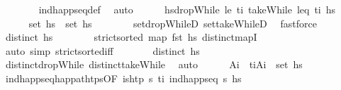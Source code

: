 \begin{isabellebody}
\ \ \ \ \ \ \isamarkupfalse%
\ ind{\isacharunderscore}{\kern0pt}happ{\isacharunderscore}{\kern0pt}seq{\isacharunderscore}{\kern0pt}def\ \isamarkupfalse%
\ auto\isanewline
\ \ \ \ \isamarkupfalse%
\ {\isacharquery}{\kern0pt}hs{\isacharprime}{\kern0pt}{\isacharequal}{\kern0pt}{\isachardoublequoteopen}dropWhile\ {\isacharparenleft}{\kern0pt}le\ t\isactrlsub i{\isacharparenright}{\kern0pt}\ {\isacharparenleft}{\kern0pt}takeWhile\ {\isacharparenleft}{\kern0pt}leq\ t\isactrlsub i{\isacharparenright}{\kern0pt}\ hs{\isacharparenright}{\kern0pt}{\isachardoublequoteclose}\isanewline
\ \ \ \ \isamarkupfalse%
\ {\isachardoublequoteopen}set\ {\isacharquery}{\kern0pt}hs{\isacharprime}{\kern0pt}\ {\isasymsubseteq}\ set\ hs{\isachardoublequoteclose}\isanewline
\ \ \ \ \ \ \isamarkupfalse%
\ set{\isacharunderscore}{\kern0pt}dropWhileD\ set{\isacharunderscore}{\kern0pt}takeWhileD\ \isamarkupfalse%
\ fastforce\isanewline
\ \ \ \ \isamarkupfalse%
\ {\isachardoublequoteopen}distinct\ hs{\isachardoublequoteclose}\isanewline
\ \ \ \ \ \ \isamarkupfalse%
\ {\isacartoucheopen}strict{\isacharunderscore}{\kern0pt}sorted\ {\isacharparenleft}{\kern0pt}map\ fst\ hs{\isacharparenright}{\kern0pt}{\isacartoucheclose}\ distinct{\isacharunderscore}{\kern0pt}mapI\ \isamarkupfalse%
\ {\isacharparenleft}{\kern0pt}auto\ simp{\isacharcolon}{\kern0pt}\ strict{\isacharunderscore}{\kern0pt}sorted{\isacharunderscore}{\kern0pt}iff{\isacharparenright}{\kern0pt}\isanewline
\ \ \ \ \isamarkupfalse%
\ \isamarkupfalse%
\ {\isachardoublequoteopen}distinct\ {\isacharquery}{\kern0pt}hs{\isacharprime}{\kern0pt}{\isachardoublequoteclose}\isanewline
\ \ \ \ \ \ \isamarkupfalse%
\ distinct{\isacharunderscore}{\kern0pt}dropWhile\ distinct{\isacharunderscore}{\kern0pt}takeWhile\ \isamarkupfalse%
\ auto\isanewline
\ \ \ \ \isamarkupfalse%
\ A\isactrlsub i\ \ {\isachardoublequoteopen}{\isacharparenleft}{\kern0pt}t\isactrlsub i{\isacharcomma}{\kern0pt}A\isactrlsub i{\isacharparenright}{\kern0pt}\ {\isasymin}\ set\ hs{\isachardoublequoteclose}\isanewline
\ \ \ \ \ \ \isamarkupfalse%
\ ind{\isacharunderscore}{\kern0pt}happ{\isacharunderscore}{\kern0pt}seq{\isacharunderscore}{\kern0pt}happ{\isacharunderscore}{\kern0pt}at{\isacharunderscore}{\kern0pt}htps{\isacharbrackleft}{\kern0pt}OF\ {\isacartoucheopen}is{\isacharunderscore}{\kern0pt}htp\ {\isasympi}s\ t\isactrlsub i{\isacartoucheclose}\ {\isacartoucheopen}ind{\isacharunderscore}{\kern0pt}happ{\isacharunderscore}{\kern0pt}seq\ {\isasympi}s\ hs{\isacartoucheclose}{\isacharbrackright}{\kern0pt}\ \isamarkupfalse%

\end{isabellebody}
